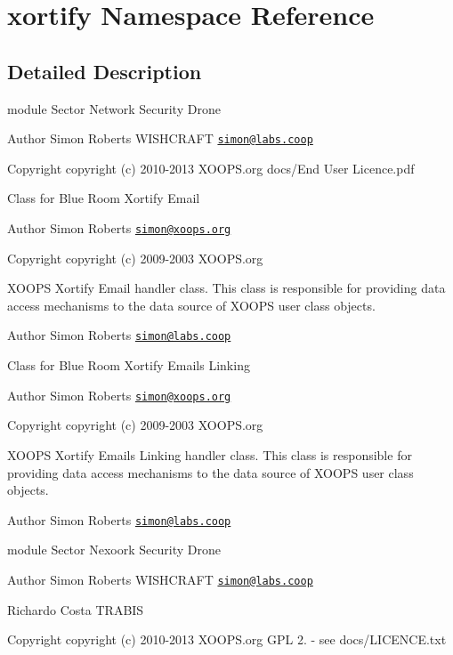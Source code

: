 \hypertarget{namespacexortify}{\section{xortify Namespace Reference}
\label{namespacexortify}
}


\subsection{Detailed Description}
module  Sector Network Security Drone \begin{DoxyAuthor}{Author}
Simon Roberts W\-I\-S\-H\-C\-R\-A\-F\-T \href{mailto:simon@labs.coop}{\tt simon@labs.\-coop} 
\end{DoxyAuthor}
\begin{DoxyCopyright}{Copyright}
copyright (c) 2010-\/2013 X\-O\-O\-P\-S.\-org  docs/\-End User Licence.\-pdf
\end{DoxyCopyright}
Class for Blue Room Xortify Email \begin{DoxyAuthor}{Author}
Simon Roberts \href{mailto:simon@xoops.org}{\tt simon@xoops.\-org} 
\end{DoxyAuthor}
\begin{DoxyCopyright}{Copyright}
copyright (c) 2009-\/2003 X\-O\-O\-P\-S.\-org
\end{DoxyCopyright}
X\-O\-O\-P\-S Xortify Email handler class. This class is responsible for providing data access mechanisms to the data source of X\-O\-O\-P\-S user class objects.

\begin{DoxyAuthor}{Author}
Simon Roberts \href{mailto:simon@labs.coop}{\tt simon@labs.\-coop}
\end{DoxyAuthor}
Class for Blue Room Xortify Emails Linking \begin{DoxyAuthor}{Author}
Simon Roberts \href{mailto:simon@xoops.org}{\tt simon@xoops.\-org} 
\end{DoxyAuthor}
\begin{DoxyCopyright}{Copyright}
copyright (c) 2009-\/2003 X\-O\-O\-P\-S.\-org
\end{DoxyCopyright}
X\-O\-O\-P\-S Xortify Emails Linking handler class. This class is responsible for providing data access mechanisms to the data source of X\-O\-O\-P\-S user class objects.

\begin{DoxyAuthor}{Author}
Simon Roberts \href{mailto:simon@labs.coop}{\tt simon@labs.\-coop}
\end{DoxyAuthor}
module  Sector Nexoork Security Drone \begin{DoxyAuthor}{Author}
Simon Roberts W\-I\-S\-H\-C\-R\-A\-F\-T \href{mailto:simon@labs.coop}{\tt simon@labs.\-coop} 

Richardo Costa T\-R\-A\-B\-I\-S 
\end{DoxyAuthor}
\begin{DoxyCopyright}{Copyright}
copyright (c) 2010-\/2013 X\-O\-O\-P\-S.\-org  G\-P\-L 2. -\/ see docs/\-L\-I\-C\-E\-N\-C\-E.\-txt 
\end{DoxyCopyright}
